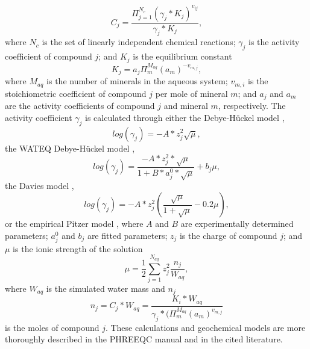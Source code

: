 \begin{supplementary}
\begin{equation}
    C_j=\frac{\Pi_{j=1}^{N_c} (\gamma_j*K_j )^{v_{ij}}}{\gamma_j*K_j},
\end{equation}
where $N_c$ is the set of linearly independent chemical reactions; $\gamma_j$ is the activity coefficient of compound $j$; and $K_j$ is the equilibrium constant
\begin{equation}
    K_j=a_j \Pi_m^{M_{aq}} (a_m)^{-v_{m,j}},
\end{equation}
where $M_{aq}$ is the number of minerals in the aqueous system; $v_{m,i}$ is the stoichiometric coefficient of compound $j$ per mole of mineral $m$; and $a_j$ and $a_m$ are the activity coefficients of compound $j$ and mineral $m$, respectively. The activity coefficient $\gamma_j$ is calculated through either the Debye-Hückel model \cite{Aqion2016ActivityModels},
\begin{equation}
    log⁡(\gamma_j)=-A*z_j^2\sqrt{\mu},
\end{equation}
the WATEQ Debye-Hückel model \cite{Aqion2016ActivityModels},
\begin{equation}
    log⁡(\gamma_j)=\frac{-A*z_j^2*\sqrt{\mu}}{1+B*a_j^0*\sqrt{\mu}}+b_j \mu,
\end{equation}
the Davies model \cite{Davies1938TheSulphates},
\begin{equation}
    log⁡(\gamma_j)=-A*z_j^2 (\frac{\sqrt{\mu}}{1+\sqrt{\mu}}-0.2\mu),
\end{equation}
or the empirical Pitzer model \cite{Pitzer1973ThermodynamicsEquations}, where $A$ and $B$ are experimentally determined parameters; $a_j^0$ and $b_j$ are fitted parameters; $z_j$ is the charge of compound $j$; and $\mu$ is the ionic strength of the solution
\begin{equation}
    \mu=\frac{1}{2}\sum_{j=1}^{N_{aq}}z_j^2 \frac{n_j}{W_{aq}},
\end{equation}
where $W_{aq}$ is the simulated water mass and $n_j$ 
\begin{equation}
    n_j=C_j*W_{aq}=\frac{K_i*W_{aq}}{\gamma_j*(\Pi_m^{M_{aq}} (a_m)^{v_{m,j}}}
\end{equation}
is the moles of compound $j$. These calculations and geochemical models are more thoroughly described in the PHREEQC manual and in the cited literature.


\end{supplementary}